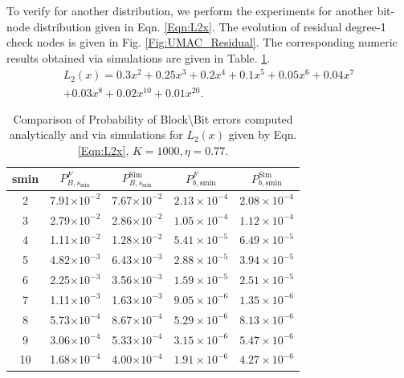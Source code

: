 To verify for another distribution, we perform the experiments for another bit-node distribution given in Eqn. \eqref{Eqn:L2x}. The evolution of residual degree-1 check nodes is given in Fig. \ref{Fig:UMAC_Residual}. The corresponding numeric results obtained via simulations are given in Table. \ref{Table:SimvsAnalytic2}.
\begin{multline}
L_{2}(x)=0.3x^2+ 0.25 x^3+ 0.2 x^4 + 0.1 x^5+ 0.05 x^{6} + 0.04 x^{7}\\
 + 0.03 x^{8} + 0.02 x^{10}+ 0.01 x^{20}.
\label{Eqn:L2x}
\end{multline}

%

\begin{table}
\centering
\begin{tabular}{c c c c c}
\hline  \hline
smin & $P_{B,s_{\text{min}}}^F$ & $P_{B,s_{\text{min}}}^{\text{Sim}}$& $P_{b,\text{smin}}^F$ & $P_{b,\text{smin}}^{\text{Sim}}$ \\
\hline
2 & 7.91$\times 10^{-2}$  &7.67$\times 10^{-2}$ &$2.13\times 10^{-4}$&$2.08\times 10^{-4}$\\
3 & 2.79$\times 10^{-2}$  &2.86$\times 10^{-2}$&$1.05\times 10^{-4}$&$1.12\times 10^{-4}$ \\
4 & 1.11$\times 10^{-2}$  &1.28$\times 10^{-2}$ &$5.41\times 10^{-5}$&$6.49\times 10^{-5}$\\
5 & 4.82$\times 10^{-3}$  &6.43$\times 10^{-3}$ & $2.88\times 10^{-5}$&$3.94\times 10^{-5}$\\
6 & 2.25$\times 10^{-3}$  &3.56$\times 10^{-3}$ &$1.59\times 10^{-5}$&$2.51\times 10^{-5}$\\
7 & 1.11$\times 10^{-3}$  &1.63$\times 10^{-3}$ &$9.05\times 10^{-6}$&$1.35\times 10^{-6}$\\
8 &5.73$\times 10^{-4}$   &8.67$\times 10^{-4}$ &$5.29\times 10^{-6}$&$8.13\times 10^{-6}$\\
9 & 3.06$\times 10^{-4}$  &5.33$\times 10^{-4}$ & $3.15\times 10^{-6}$&$5.47\times 10^{-6}$\\
10 & 1.68$\times 10^{-4}$ &4.00$\times 10^{-4}$&$1.91\times 10^{-6}$&$4.27\times 10^{-6}$\\
\end{tabular}
\caption{Comparison of Probability of Block\textbackslash Bit errors computed analytically and via simulations for $L_2(x)$ given by Eqn. \eqref{Eqn:L2x}, $K=1000, \eta=0.77$.}
\label{Table:SimvsAnalytic2}
\end{table}


